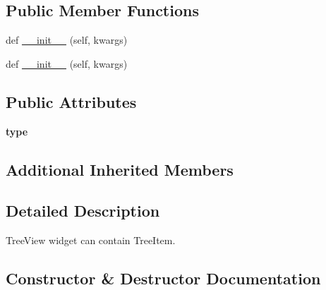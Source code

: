 \subsection*{Public Member Functions}
\begin{DoxyCompactItemize}
\item 
def \hyperlink{classremi_1_1gui_1_1TreeView_a81da06fd2066221da22be4382def5c6c}{\+\_\+\+\_\+init\+\_\+\+\_\+} (self, kwargs)
\item 
def \hyperlink{classremi_1_1gui_1_1TreeView_a81da06fd2066221da22be4382def5c6c}{\+\_\+\+\_\+init\+\_\+\+\_\+} (self, kwargs)
\end{DoxyCompactItemize}
\subsection*{Public Attributes}
\begin{DoxyCompactItemize}
\item 
{\bfseries type}\hypertarget{classremi_1_1gui_1_1TreeView_ad77003982c42e81a5b7a0edd39401032}{}\label{classremi_1_1gui_1_1TreeView_ad77003982c42e81a5b7a0edd39401032}

\end{DoxyCompactItemize}
\subsection*{Additional Inherited Members}


\subsection{Detailed Description}
\begin{DoxyVerb}TreeView widget can contain TreeItem.\end{DoxyVerb}
 

\subsection{Constructor \& Destructor Documentation}
